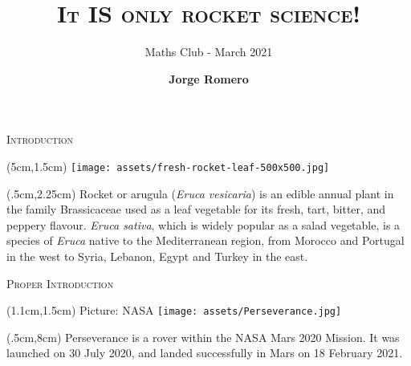 \documentclass[9pt]{beamer}
\title{\textsc{It IS only rocket science!}}
\subtitle{Maths Club - March 2021}
\author{\textbf{Jorge Romero}}
\institute{University of Liverpool, Jyväskylän Yliopisto}
\begin{document}
\titlepage


\begin{frame}{\textsc{Introduction}}
\begin{textblock*}{7.5cm}(5cm,1.5cm)
\texttt{[image: assets/fresh-rocket-leaf-500x500.jpg]}
\end{textblock*}

\begin{textblock*}{4cm}(.5cm,2.25cm)
Rocket or arugula (\textit{Eruca vesicaria}) is an edible annual plant in the family Brassicaceae used as a leaf vegetable for its fresh, tart, bitter, and peppery flavour. \textit{Eruca sativa}, which is widely popular as a salad vegetable, is a species of \textit{Eruca} native to the Mediterranean region, from Morocco and Portugal in the west to Syria, Lebanon, Egypt and Turkey in the east.
\end{textblock*}
\end{frame}

\begin{frame}{\textsc{Proper Introduction}}
\begin{textblock*}{10.5cm}(1.1cm,1.5cm)
{\hfill\footnotesize Picture: NASA} 
\texttt{[image: assets/Perseverance.jpg]}
\end{textblock*}

\begin{textblock*}{12cm}(.5cm,8cm)
Perseverance is a rover within the NASA Mars 2020 Mission. It was launched on 30 July 2020, and landed successfully in Mars on 18 February 2021. 
\end{textblock*}
\end{frame}
\end{document}
